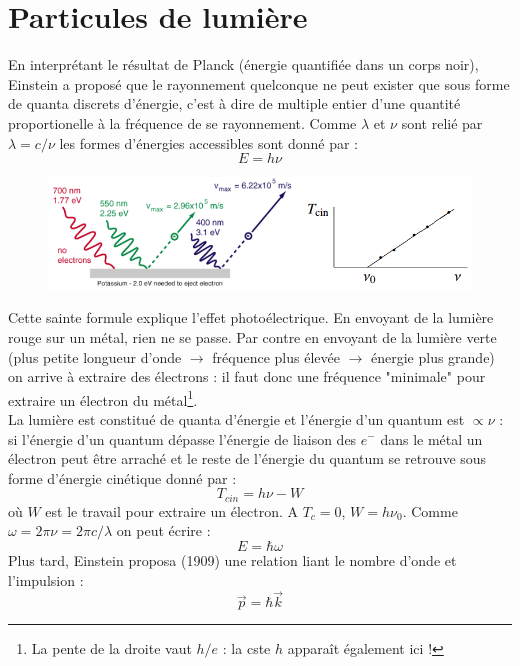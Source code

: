 \documentclass	[11pt, a4paper, openany]{book}
\begin{document}
\section{Particules de lumière}
En interprétant le résultat de Planck (énergie quantifiée dans un corps noir), Einstein a proposé que le rayonnement quelconque ne peut exister que sous forme de quanta discrets d'énergie, c'est à dire de multiple entier d'une quantité proportionelle à la fréquence de se rayonnement. Comme $\lambda$ et $\nu$ sont relié par $\lambda = c/\nu$ les formes d'énergies accessibles sont donné par :
\begin{equation}
E = h\nu
\end{equation}
\begin{figure}
\includegraphics[scale=0.3]{img/image1.png}
\end{figure}
Cette sainte formule explique l'effet photoélectrique. En envoyant de la lumière rouge sur un métal, rien ne se passe. Par contre en envoyant de la lumière verte (plus petite longueur d'onde $\rightarrow$ fréquence plus élevée $\rightarrow$ énergie plus grande) on arrive à extraire des électrons : il faut donc une fréquence "minimale" pour extraire un électron du métal\footnote{La pente de la droite vaut $h/e$ : la cste $h$ apparaît également ici !}.\\
La lumière est constitué de quanta d'énergie et l'énergie d'un quantum est $\propto \nu$ : si l'énergie d'un quantum dépasse l'énergie de liaison des $e^-$ dans le métal un électron peut être arraché et le reste de l'énergie du quantum se retrouve sous forme d'énergie cinétique donné par :
\begin{equation}
T_{cin} = h\nu - W
\end{equation}
où $W$ est le travail pour extraire un électron. A $T_c = 0$, $W = h\nu_0$. Comme $\omega = 2\pi \nu = 2\pi c /\lambda$ on peut écrire :
\begin{equation}\label{eq:ehbaromega}
E = \hbar \omega
\end{equation}
Plus tard, Einstein proposa (1909) une relation liant le nombre d'onde et l'impulsion :
\begin{equation}\label{eq:phbark}
\vec{p} = \hbar \vec{k}
\end{equation}
\end{document}
